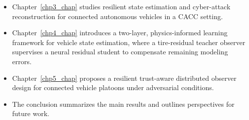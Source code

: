 \begin{itemize}
    \item Chapter~\ref{chp3_chap} studies resilient state estimation and cyber-attack reconstruction for connected autonomous vehicles in a CACC setting.
    \item Chapter~\ref{chp4_chap} introduces a two-layer, physics-informed learning framework for vehicle state estimation, where a tire-residual teacher observer supervises a neural residual student to compensate remaining modeling errors.
    \item Chapter~\ref{chp5_chap} proposes a resilient trust-aware distributed observer design for connected vehicle platoons under adversarial conditions.
    \item The conclusion summarizes the main results and outlines perspectives for future work.
\end{itemize}
